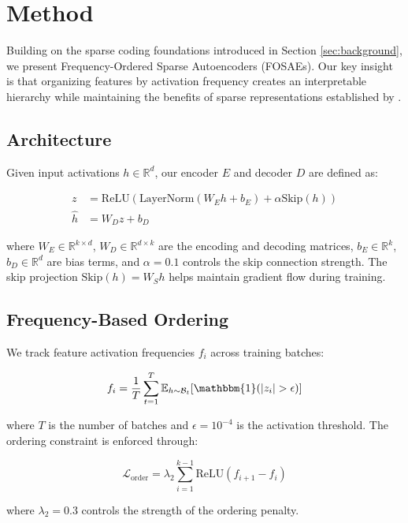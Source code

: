 \documentclass{article} %
\begin{document}
\section{Method}
\label{sec:method}

Building on the sparse coding foundations introduced in Section \ref{sec:background}, we present Frequency-Ordered Sparse Autoencoders (FOSAEs). Our key insight is that organizing features by activation frequency creates an interpretable hierarchy while maintaining the benefits of sparse representations established by \cite{Olshausen1996EmergenceOS}.

\subsection{Architecture}
Given input activations $h \in \mathbb{R}^d$, our encoder $E$ and decoder $D$ are defined as:

\begin{align}
z &= \text{ReLU}(\text{LayerNorm}(W_E h + b_E) + \alpha \text{Skip}(h)) \\
\hat{h} &= W_D z + b_D
\end{align}

where $W_E \in \mathbb{R}^{k \times d}$, $W_D \in \mathbb{R}^{d \times k}$ are the encoding and decoding matrices, $b_E \in \mathbb{R}^k$, $b_D \in \mathbb{R}^d$ are bias terms, and $\alpha=0.1$ controls the skip connection strength. The skip projection $\text{Skip}(h) = W_S h$ helps maintain gradient flow during training.

\subsection{Frequency-Based Ordering}
We track feature activation frequencies $f_i$ across training batches:

\begin{equation}
f_i = \frac{1}{T} \sum_{t=1}^T \mathbb{E}_{h \sim \mathcal{B}_t}[\mathbbm{1}(|z_i| > \epsilon)]
\end{equation}

where $T$ is the number of batches and $\epsilon=10^{-4}$ is the activation threshold. The ordering constraint is enforced through:

\begin{equation}
\mathcal{L}_{\text{order}} = \lambda_2 \sum_{i=1}^{k-1} \text{ReLU}(f_{i+1} - f_i)
\end{equation}

where $\lambda_2=0.3$ controls the strength of the ordering penalty.
\end{document}
